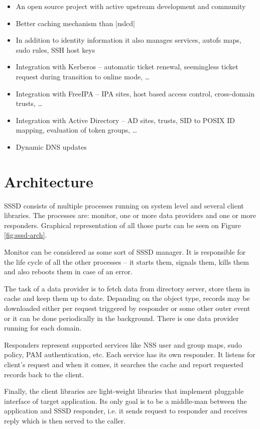 \begin{itemize}
  \item An open source project with active upstream development and community
  \item Better caching mechanism than |nslcd|
  \item In addition to identity information it also manages services, autofs
        maps, sudo rules, SSH host keys
  \item Integration with Kerberos -- automatic ticket renewal, seemingless
        ticket request during transition to online mode, \ldots
  \item Integration with FreeIPA -- IPA sites, host based access control,
        cross-domain trusts, \ldots
  \item Integration with Active Directory -- AD sites, trusts, SID to POSIX ID
        mapping, evaluation of token groups, \ldots
  \item Dynamic DNS updates 
\end{itemize}

\section{Architecture}
\label{sssd:arch}

SSSD consists of multiple processes running on system level and several client
libraries. The processes are: monitor, one or more data providers and one or
more responders. Graphical representation of all those parts can be seen on
Figure \ref{fig:sssd-arch}.

Monitor can be considered as some sort of SSSD manager. It is responsible for
the life cycle of all the other processes -- it starts them, signals them,
kills them and also reboots them in case of an error.

The task of a data provider is to fetch data from directory server, store them
in cache and keep them up to date. Depanding on the object type, records may
be downloaded either per request triggered by responder or some other outer
event or it can be done periodically in the background. There is one data
provider running for each domain.

Responders represent supported services like NSS user and group maps, sudo
policy, PAM authentication, etc. Each service has its own responder. It listens
for client's request and when it comes, it searches the cache and report
requested records back to the client.

Finally, the client libraries are light-weight libraries that implement
pluggable interface of target application. Its only goal is to be a middle-man
between the application and SSSD responder, i.e. it sends request to responder
and receives reply which is then served to the caller.

